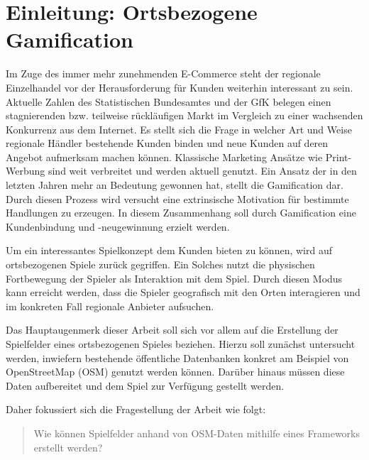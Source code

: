 \chapter{Einleitung: Ortsbezogene Gamification}
\label{ch1:Einleitung}

Im Zuge des immer mehr zunehmenden E-Commerce steht der regionale Einzelhandel vor der Herausforderung für Kunden weiterhin interessant zu sein. Aktuelle Zahlen des Statistischen Bundesamtes \citep{DWN.2012} und der GfK \cite{Gfk.2009} belegen einen stagnierenden bzw. teilweise rückläufigen Markt im Vergleich zu einer wachsenden Konkurrenz aus dem Internet.
Es stellt sich die Frage in welcher Art und Weise regionale Händler bestehende Kunden binden und neue Kunden auf deren Angebot aufmerksam machen können.
Klassische Marketing Ansätze wie Print-Werbung sind weit verbreitet und werden aktuell genutzt.
Ein Ansatz der in den letzten Jahren mehr an Bedeutung gewonnen hat, stellt die Gamification dar. Durch diesen Prozess wird versucht eine extrinsische Motivation für bestimmte Handlungen zu erzeugen. In diesem Zusammenhang soll durch Gamification eine Kundenbindung und -neugewinnung erzielt werden.

Um ein interessantes Spielkonzept dem Kunden bieten zu können, wird auf ortsbezogenen Spiele zurück gegriffen.\cite{Salt.2011}
Ein Solches nutzt die physischen Fortbewegung der Spieler als Interaktion mit dem Spiel.
Durch diesen Modus kann erreicht werden, dass die Spieler geografisch mit den Orten interagieren und im konkreten Fall regionale Anbieter aufsuchen.

Das Hauptaugenmerk dieser Arbeit soll sich vor allem auf die Erstellung der Spielfelder eines ortsbezogenen Spieles beziehen. Hierzu soll zunächst untersucht werden, inwiefern bestehende öffentliche Datenbanken konkret am Beispiel von OpenStreetMap (OSM) genutzt werden können. Darüber hinaus müssen diese Daten aufbereitet und dem Spiel zur Verfügung gestellt werden.

Daher fokussiert sich die Fragestellung der Arbeit wie folgt:
\begin{quote}
\item Wie können Spielfelder anhand von OSM-Daten mithilfe eines Frameworks erstellt werden?
\end{quote}
\vspace{1cm}

